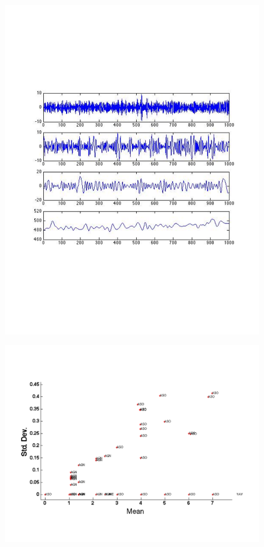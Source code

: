 \begin{figure}[t!] %
\centering
\includegraphics[width=0.75\columnwidth]{figs/KETI413_co2_6h_3IMFs}
\caption{}
\label{fig:co2_3IMFs}
\end{figure}


\begin{figure}[t!] %
\centering
\includegraphics[width=1.0\columnwidth]{figs/ASOvsAGN}
\caption{}
\label{fig:asovsagn}
\end{figure}


